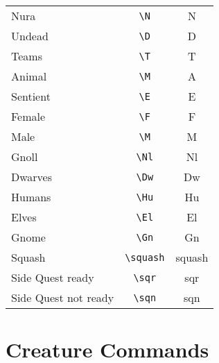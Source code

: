 \documentclass[a4paper,openany]{book}
\begin{document}
\begin{multicols}{2}
\begin{tabularx}{\linewidth}{Xcc}
  Nura & {\tt \textbackslash{N}} & \gls{N} \\

  Undead & {\tt \textbackslash{D}} & \gls{D} \\
  \hline
  Teams & {\tt \textbackslash{T}} & \gls{T} \\

  Animal & {\tt \textbackslash{M}} & \gls{A} \\

  Sentient & {\tt \textbackslash{E}} & \gls{E} \\

  Female & {\tt \textbackslash{F}} & \gls{F} \\

  Male & {\tt \textbackslash{M}} & \gls{M} \\

  \hline
  Gnoll & {\tt \textbackslash{Nl}} & \gls{Nl} \\

  Dwarves & {\tt \textbackslash{Dw}} & \gls{Dw} \\

  Humans & {\tt \textbackslash{Hu}} & \gls{Hu} \\

  Elves & {\tt \textbackslash{El}} & \gls{El} \\

  Gnome & {\tt \textbackslash{Gn}} & \gls{Gn} \\
  \hline
  Squash & {\tt \textbackslash{squash}} & \gls{squash} \\

  Side Quest ready & {\tt \textbackslash{sqr}} & \gls{sqr} \\

  Side Quest not ready & {\tt \textbackslash{sqn}} & \gls{sqn} \\

\end{tabularx}

\end{multicols}

\section{Creature Commands}
\end{document}
